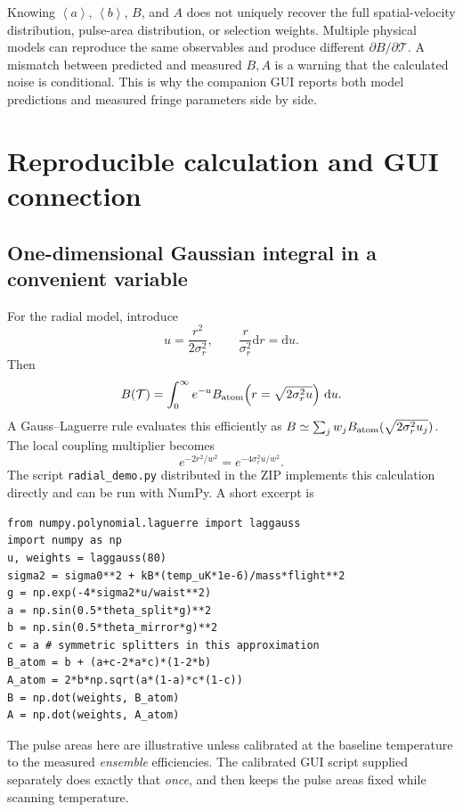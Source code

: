 \documentclass[11pt,a4paper]{article}
\numberwithin{equation}{section}
\newcommand{\Tat}{\mathcal{T}}
\newcommand{\dd}{\mathrm{d}}
\newcommand{\av}[1]{\left\langle #1\right\rangle}
\begin{document}
Knowing $\av a$, $\av b$, $B$, and $A$ does not uniquely recover the full
spatial-velocity distribution, pulse-area distribution, or selection weights.
Multiple physical models can reproduce the same observables and produce
different $\partial B/\partial\Tat$. A mismatch between predicted and
measured $B,A$ is a warning that the calculated noise is conditional. This is
why the companion GUI reports both model predictions and measured fringe
parameters side by side.

\section{Reproducible calculation and GUI connection}

\subsection{One-dimensional Gaussian integral in a convenient variable}

For the radial model, introduce
\begin{equation}
 u=\frac{r^2}{2\sigma_r^2},\qquad
 \frac r{\sigma_r^2}\dd r=\dd u.
\end{equation}
Then
\begin{equation}\label{eq:laguerre}
B(\Tat)=\int_0^\infty e^{-u}
 B_{\rm atom}\!\left(r=\sqrt{2\sigma_r^2u}\right)\,\dd u.
\end{equation}
A Gauss--Laguerre rule evaluates this efficiently as
$B\simeq\sum_j w_j B_{\rm atom}(\sqrt{2\sigma_r^2u_j})$.
The local coupling multiplier becomes
\begin{equation}
 e^{-2r^2/w^2}=e^{-4\sigma_r^2u/w^2}.
\end{equation}
The script \texttt{radial\_demo.py} distributed in the ZIP implements this
calculation directly and can be run with NumPy. A short excerpt is
\begin{lstlisting}[style=mypython]
from numpy.polynomial.laguerre import laggauss
import numpy as np
u, weights = laggauss(80)
sigma2 = sigma0**2 + kB*(temp_uK*1e-6)/mass*flight**2
g = np.exp(-4*sigma2*u/waist**2)
a = np.sin(0.5*theta_split*g)**2
b = np.sin(0.5*theta_mirror*g)**2
c = a # symmetric splitters in this approximation
B_atom = b + (a+c-2*a*c)*(1-2*b)
A_atom = 2*b*np.sqrt(a*(1-a)*c*(1-c))
B = np.dot(weights, B_atom)
A = np.dot(weights, A_atom)
\end{lstlisting}
The pulse areas here are illustrative unless calibrated at the baseline
temperature to the measured \emph{ensemble} efficiencies. The calibrated GUI
script supplied separately does exactly that \emph{once}, and then keeps the
pulse areas fixed while scanning temperature.
\end{document}
